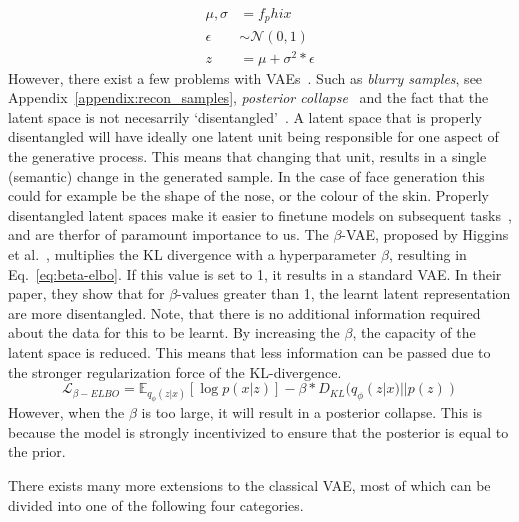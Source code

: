 \begin{equation}
    \begin{split}
        \mu, \sigma & = f_phi{x}                  \\
        \epsilon    & \sim \mathcal{N}(0, 1)      \\
        z           & = \mu + \sigma^2 * \epsilon
    \end{split}
    \label{eq:reparameterization-trick}
\end{equation}
However, there exist a few problems with VAEs~\cite{tomczak2021deep}.
Such as \emph{blurry samples}, see Appendix~\ref{appendix:recon_samples}, \emph{posterior collapse}~\cite{DBLP:journals/corr/BowmanVVDJB15} and the fact that the latent space is not necesarrily `disentangled'~\cite{higgins2017betavae}. A latent space that is properly disentangled will have ideally one latent unit being responsible for one aspect of the generative process. This means that changing that unit, results in a single (semantic) change in the generated sample. In the case of face generation this could for example be the shape of the nose, or the colour of the skin. Properly disentangled latent spaces make it easier to finetune models on subsequent tasks~\cite{bengio2014representationlearningreviewnew}, and are therfor of paramount importance to us. The $\beta$-VAE, proposed by Higgins et al.~\cite{higgins2017betavae}, multiplies the KL divergence with a hyperparameter $\beta$, resulting in Eq.~\ref{eq:beta-elbo}. If this value is set to 1, it results in a standard VAE. In their paper, they show that for $\beta$-values greater than 1, the learnt latent representation are more disentangled. Note, that there is no additional information required about the data for this to be learnt. By increasing the $\beta$, the capacity of the latent space is reduced. This means that less information can be passed due to the stronger regularization force of the KL-divergence.
\begin{equation}
    \mathcal{L}_{\beta-ELBO} = \mathbb{E}_{q_{\phi}(z|x)}[\log p(x|z)] - \beta * D_{KL}(q_{\phi}(z|x) || p(z))
    \label{eq:beta-elbo}
\end{equation}
However, when the $\beta$ is too large, it will result in a posterior collapse. This is because the model is strongly incentivized to ensure that the posterior is equal to the prior.

There exists many more extensions to the classical VAE, most of which can be divided into one of the following four categories.

